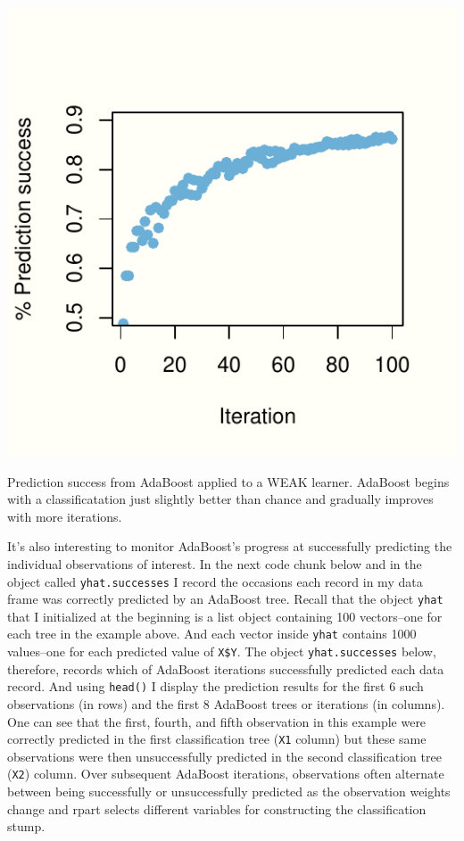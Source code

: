 \documentclass[]{tufte-handout}
\begin{document}
\begin{marginfigure}
\includegraphics{2018-02-19-data-science-unplugged-additive-boosting_files/figure-latex/boost.plot.weak-1} \caption[Prediction success from AdaBoost applied to a WEAK learner]{Prediction success from AdaBoost applied to a WEAK learner. AdaBoost begins with a classificatation just slightly better than chance and gradually improves with more iterations.}\label{fig:boost.plot.weak}
\end{marginfigure}

It's also interesting to monitor AdaBoost's progress at successfully
predicting the individual observations of interest. In the next code
chunk below and in the object called \texttt{yhat.successes} I record
the occasions each record in my data frame was correctly predicted by an
AdaBoost tree. Recall that the object \texttt{yhat} that I initialized
at the beginning is a list object containing 100 vectors--one for each
tree in the example above. And each vector inside \texttt{yhat} contains
1000 values--one for each predicted value of \texttt{X\$Y}. The object
\texttt{yhat.successes} below, therefore, records which of AdaBoost
iterations successfully predicted each data record. And using
\texttt{head()} I display the prediction results for the first 6 such
observations (in rows) and the first 8 AdaBoost trees or iterations (in
columns). One can see that the first, fourth, and fifth observation in
this example were correctly predicted in the first classification tree
(\texttt{X1} column) but these same observations were then
unsuccessfully predicted in the second classification tree (\texttt{X2})
column. Over subsequent AdaBoost iterations, observations often
alternate between being successfully or unsuccessfully predicted as the
observation weights change and rpart selects different variables for
constructing the classification stump.
\end{document}
